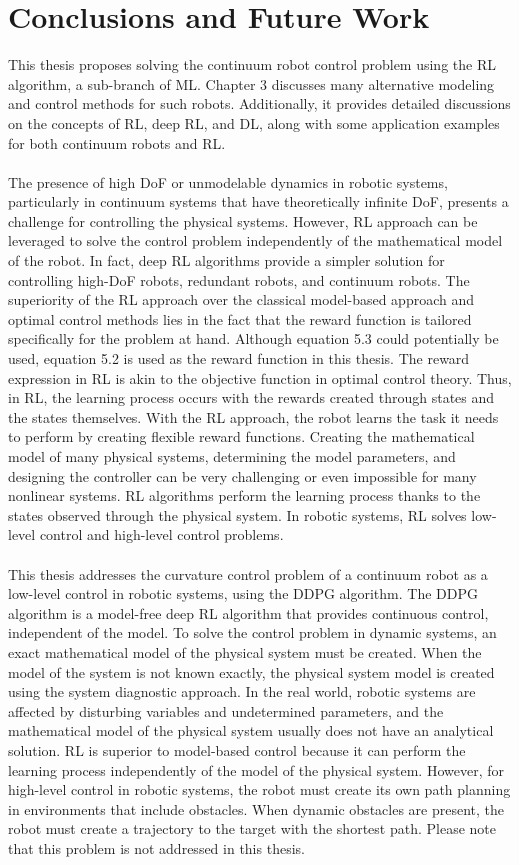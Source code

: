 \documentclass[12pt,twoside,a4]{mwbk}
\begin{document}
\chapter{Conclusions and Future Work}
This thesis proposes solving the continuum robot control problem using the RL algorithm, a sub-branch of ML. Chapter 3 discusses many alternative modeling and control methods for such robots. Additionally, it provides detailed discussions on the concepts of RL, deep RL, and DL, along with some application examples for both continuum robots and RL.
\\ \\
The presence of high DoF or unmodelable dynamics in robotic systems, particularly in continuum systems that have theoretically infinite DoF, presents a challenge for controlling the physical systems. However, RL approach can be leveraged to solve the control problem independently of the mathematical model of the robot. In fact, deep RL algorithms provide a simpler solution for controlling high-DoF robots, redundant robots, and continuum robots. The superiority of the RL approach over the classical model-based approach and optimal control methods lies in the fact that the reward function is tailored specifically for the problem at hand. Although equation 5.3 could potentially be used, equation 5.2 is used as the reward function in this thesis. The reward expression in RL is akin to the objective function in optimal control theory. Thus, in RL, the learning process occurs with the rewards created through states and the states themselves. With the RL approach, the robot learns the task it needs to perform by creating flexible reward functions. Creating the mathematical model of many physical systems, determining the model parameters, and designing the controller can be very challenging or even impossible for many nonlinear systems. RL algorithms perform the learning process thanks to the states observed through the physical system. In robotic systems, RL solves low-level control and high-level control problems.
\\ \\
This thesis addresses the curvature control problem of a continuum robot as a low-level control in robotic systems, using the DDPG algorithm. The DDPG algorithm is a model-free deep RL algorithm that provides continuous control, independent of the model. To solve the control problem in dynamic systems, an exact mathematical model of the physical system must be created. When the model of the system is not known exactly, the physical system model is created using the system diagnostic approach. In the real world, robotic systems are affected by disturbing variables and undetermined parameters, and the mathematical model of the physical system usually does not have an analytical solution. RL is superior to model-based control because it can perform the learning process independently of the model of the physical system. However, for high-level control in robotic systems, the robot must create its own path planning in environments that include obstacles. When dynamic obstacles are present, the robot must create a trajectory to the target with the shortest path. Please note that this problem is not addressed in this thesis.
\end{document}
